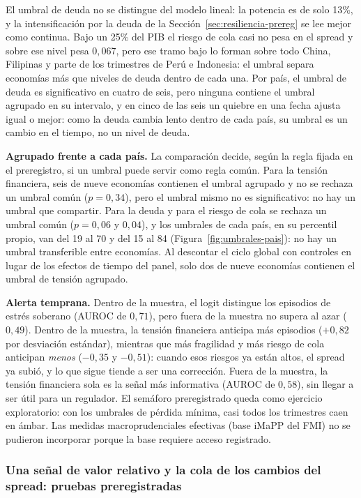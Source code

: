 El umbral de deuda no se distingue del modelo lineal: la potencia es de solo 13\%, y la intensificación por la deuda de la Sección~\ref{sec:resiliencia-prereg} se lee mejor como continua. Bajo un 25\% del PIB el riesgo de cola casi no pesa en el spread y sobre ese nivel pesa $0{,}067$, pero ese tramo bajo lo forman sobre todo China, Filipinas y parte de los trimestres de Perú e Indonesia: el umbral separa economías más que niveles de deuda dentro de cada una. Por país, el umbral de deuda es significativo en cuatro de seis, pero ninguna contiene el umbral agrupado en su intervalo, y en cinco de las seis un quiebre en una fecha ajusta igual o mejor: como la deuda cambia lento dentro de cada país, su umbral es un cambio en el tiempo, no un nivel de deuda.

\textbf{Agrupado frente a cada país.} La comparación decide, según la regla fijada en el preregistro, si un umbral puede servir como regla común. Para la tensión financiera, seis de nueve economías contienen el umbral agrupado y no se rechaza un umbral común ($p=0{,}34$), pero el umbral mismo no es significativo: no hay un umbral que compartir. Para la deuda y para el riesgo de cola se rechaza un umbral común ($p=0{,}06$ y $0{,}04$), y los umbrales de cada país, en su percentil propio, van del 19 al 70 y del 15 al 84 (Figura~\ref{fig:umbrales-pais}): no hay un umbral transferible entre economías. Al descontar el ciclo global con controles en lugar de los efectos de tiempo del panel, solo dos de nueve economías contienen el umbral de tensión agrupado.

\textbf{Alerta temprana.} Dentro de la muestra, el logit distingue los episodios de estrés soberano (AUROC de $0{,}71$), pero fuera de la muestra no supera al azar ($0{,}49$). Dentro de la muestra, la tensión financiera anticipa más episodios ($+0{,}82$ por desviación estándar), mientras que más fragilidad y más riesgo de cola anticipan \emph{menos} ($-0{,}35$ y $-0{,}51$): cuando esos riesgos ya están altos, el spread ya subió, y lo que sigue tiende a ser una corrección. Fuera de la muestra, la tensión financiera sola es la señal más informativa (AUROC de $0{,}58$), sin llegar a ser útil para un regulador. El semáforo preregistrado queda como ejercicio exploratorio: con los umbrales de pérdida mínima, casi todos los trimestres caen en ámbar. Las medidas macroprudenciales efectivas (base iMaPP del FMI) no se pudieron incorporar porque la base requiere acceso registrado.

\subsubsection{Una señal de valor relativo y la cola de los cambios del spread: pruebas preregistradas}
\label{sec:quant-prereg}

